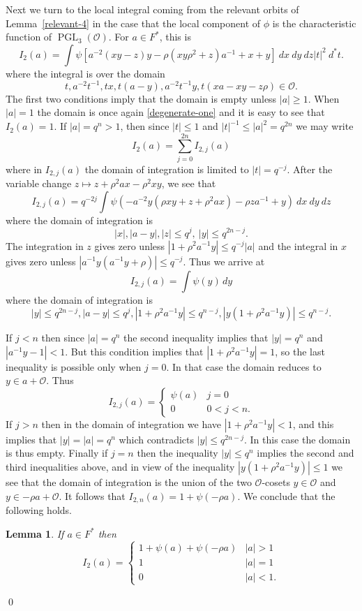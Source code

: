 \documentclass[12pt]{amsart}
\newcommand{\abs}[1]{\left|{#1}\right|}
\newcommand{\PGL}{\operatorname{PGL}}
\renewcommand{\O}{\mathcal{O}}
\newtheorem{lemma}[theorem]{Lemma}
\theoremstyle{remark}
\begin{document}
Next we turn to the local integral coming from the relevant orbits of Lemma~\ref{relevant-4} in the case that the local component of $\phi$ is the characteristic function of $\PGL_3(\O)$.  For $a\in F^*$, this is
$$
I_2(a)=\int \psi[a^{-2}(xy-z)y-\rho(xy\rho^2+z)a^{-1}+x+y] \ dx\ dy\ dz\abs{t}^2\ d^*t.
$$
where the integral is over the domain
\[
t,a^{-2}t^{-1},tx,t(a-y),a^{-2}t^{-1}y,t(xa-xy-z\rho)\in \O.
\]
The first two conditions imply that the domain is empty unless $|a|\geq1$.
When $\abs{a}=1$ the domain is once again \eqref{degenerate-one}
and it is easy to see that $I_2(a)=1$.  If $|a|=q^n>1$, then since $|t|\leq1$ and $|t|^{-1}\leq |a|^2=q^{2n}$ 
we may write 
\[
I_2(a)=\sum_{j=0}^{2n} I_{2,j}(a)
\]
where in $I_{2,j}(a)$ the domain of integration is limited to $|t|=q^{-j}$.  After the variable change $z\mapsto z+\rho^2 a x -\rho^2 x y$, we see that
\[
I_{2,j}(a)=q^{-2j} \int \psi(-a^{-2}y(\rho x y + z + \rho^2 a x)-\rho z a^{-1}+ y)\ dx\ dy \ dz
\]
where the domain of integration is 
\[
\abs{x},\abs{a-y},\abs{z}\le q^j,\ \abs{y}\le q^{2n-j}.
\]
The integration in $z$ gives zero unless $|1+\rho^2 a^{-1} y|\leq q^{-j} |a|$ and the integral in $x$ gives zero unless
$|a^{-1}y(a^{-1}y+\rho)|\leq q^{-j}$.  Thus we arrive at 
$$I_{2,j}(a)=\int \psi(y)\,dy$$
where the domain of integration is
$$|y|\leq q^{2n-j}, |a-y|\leq q^j, |1+\rho^2a^{-1}y|\leq q^{n-j}, |y(1+\rho^2a^{-1}y)|\leq q^{n-j}.$$

If $j<n$ then since $|a|=q^n$ the second inequality implies that $|y|=q^n$ and $|a^{-1}y-1|<1$.  But this
condition implies that $|1+\rho^2 a^{-1}y|=1$, so the last inequality is possible
only when $j=0$. In that case the domain reduces to $y\in a+\O$.  Thus
\[
I_{2,j}(a)=\begin{cases} \psi(a)& j=0 \\  0 & 0<j<n.\end{cases}
\]
If $j>n$ then in the domain of integration we have $|1+\rho^2 a^{-1}y|<1$,
 and this implies that $|y|=|a|=q^n$ which contradicts $|y|\leq q^{2n-j}$.  In this case the domain is thus empty.
Finally if $j=n$ then 
the inequality $|y|\leq q^n$ implies the second and third inequalities above, and in view of the inequality 
$\abs{y(1+\rho^2 a^{-1}y)}\leq1$ we see that the domain of integration is the union of the two $\O$-cosets $y\in \O$ and $y\in -\rho a+\O$.
It follows that $I_{2,n}(a)=1+\psi(-\rho a)$.  We conclude that the following holds.
\begin{lemma}
If $a\in F^*$ then
$$I_2(a)=\begin{cases} 1+\psi(a)+\psi(-\rho a) & \abs{a}>1 \\ 1 & \abs{a}=1 \\ 0 & \abs{a}<1. \end{cases}$$
\end{lemma}
\qed
\end{document}
